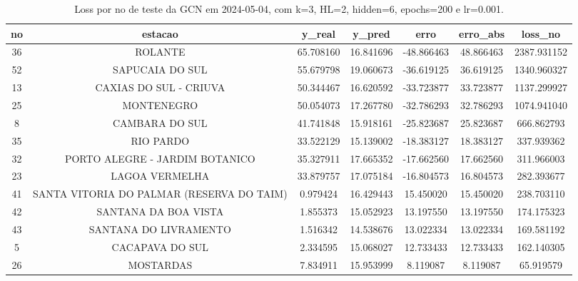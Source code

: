\begin{table}[h]
\centering
\caption{Loss por no de teste da GCN em 2024-05-04, com k=3, HL=2, hidden=6, epochs=200 e lr=0.001.}
\label{tab:gcn_loss_k3_hl2_h6_e200_d20240504}
\begin{tabular}{ccccccc}
\toprule
no & estacao & y\_real & y\_pred & erro & erro\_abs & loss\_no \\
\midrule
36 & ROLANTE & 65.708160 & 16.841696 & -48.866463 & 48.866463 & 2387.931152 \\
52 & SAPUCAIA DO SUL & 55.679798 & 19.060673 & -36.619125 & 36.619125 & 1340.960327 \\
13 & CAXIAS DO SUL - CRIUVA & 50.344467 & 16.620592 & -33.723877 & 33.723877 & 1137.299927 \\
25 & MONTENEGRO & 50.054073 & 17.267780 & -32.786293 & 32.786293 & 1074.941040 \\
8 & CAMBARA DO SUL & 41.741848 & 15.918161 & -25.823687 & 25.823687 & 666.862793 \\
35 & RIO PARDO & 33.522129 & 15.139002 & -18.383127 & 18.383127 & 337.939362 \\
32 & PORTO ALEGRE - JARDIM BOTANICO & 35.327911 & 17.665352 & -17.662560 & 17.662560 & 311.966003 \\
23 & LAGOA VERMELHA & 33.879757 & 17.075184 & -16.804573 & 16.804573 & 282.393677 \\
41 & SANTA VITORIA DO PALMAR (RESERVA DO TAIM) & 0.979424 & 16.429443 & 15.450020 & 15.450020 & 238.703110 \\
42 & SANTANA DA BOA VISTA & 1.855373 & 15.052923 & 13.197550 & 13.197550 & 174.175323 \\
43 & SANTANA DO LIVRAMENTO & 1.516342 & 14.538676 & 13.022334 & 13.022334 & 169.581192 \\
5 & CACAPAVA DO SUL & 2.334595 & 15.068027 & 12.733433 & 12.733433 & 162.140305 \\
26 & MOSTARDAS & 7.834911 & 15.953999 & 8.119087 & 8.119087 & 65.919579 \\
\bottomrule
\end{tabular}
\end{table}
